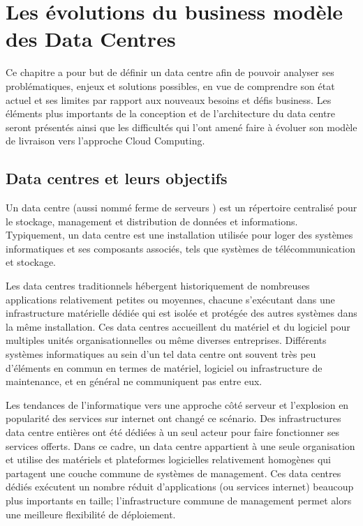
\chapter{Les évolutions du business modèle des Data Centres}
\label{chap-1}

Ce chapitre a pour but de définir un data centre afin de pouvoir analyser ses problématiques, enjeux et solutions possibles, en vue de comprendre son état actuel et ses limites par rapport aux nouveaux besoins et défis business. Les éléments plus importants de la conception et de l'architecture du data centre seront présentés ainsi que les difficultés qui l'ont amené faire à évoluer son modèle de livraison vers l'approche Cloud Computing.

\section{Data centres et leurs objectifs}

Un data centre (aussi nommé \og ferme de serveurs \fg{}) est un répertoire centralisé pour le stockage, management et distribution de données et informations. Typiquement, un data centre est une installation utilisée pour loger des systèmes informatiques et ses composants associés, tels que systèmes de télécommunication et stockage. 

Les data centres traditionnels hébergent historiquement de nombreuses applications relativement petites ou moyennes, chacune s'exécutant dans une infrastructure matérielle dédiée qui est isolée et protégée des autres systèmes dans la même installation. Ces data centres accueillent du matériel et du logiciel pour multiples unités organisationnelles ou même diverses entreprises. Différents systèmes informatiques au sein d'un tel data centre ont souvent très peu d'éléments en commun en termes de matériel, logiciel ou infrastructure de maintenance, et en général ne communiquent pas entre eux. 


Les tendances de l'informatique vers une approche côté serveur et l'explosion en popularité des services sur internet ont changé ce scénario. Des infrastructures data centre entières ont été dédiées à un seul acteur pour faire fonctionner ses services offerts. Dans ce cadre, un data centre appartient à une seule organisation et utilise des matériels et plateformes logicielles relativement homogènes qui partagent une couche commune de systèmes de management. Ces data centres dédiés exécutent un nombre réduit d'applications (ou services internet) beaucoup plus importants en taille; l'infrastructure commune de management permet alors une meilleure flexibilité de déploiement. 

